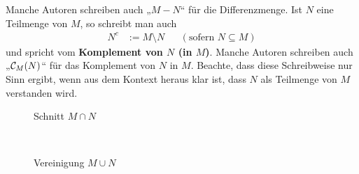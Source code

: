\begin{de}
\begin{itemize}
        Manche Autoren schreiben auch „$M-N$“ für die Differenzmenge. Ist $N$ eine Teilmenge von $M$, so schreibt man auch
        \begin{align*}
            N^c & := M\setminus N && (\text{sofern $N\subseteq M$})
        \end{align*}
        und spricht vom \textbf{Komplement von $N$ (in $M$)}. Manche Autoren schreiben auch „$\mathcal C_M(N)$“ für das Komplement von $N$ in $M$. Beachte, dass diese Schreibweise nur Sinn ergibt, wenn aus dem Kontext heraus klar ist, dass $N$ als Teilmenge von $M$ verstanden wird.
	\end{itemize}
    \begin{figure}[ht]
        \begin{minipage}{.48\textwidth}
            \centering
            \caption{Schnitt $M\cap N$}
        \end{minipage}
        \quad
        \begin{minipage}{.48\textwidth}
            \centering
            \caption{Vereinigung $M\cup N$}
        \end{minipage}
        \quad\\[1em]
        \begin{minipage}{.48\textwidth}
            \centering

\end{minipage}
\end{figure}
\end{de}
